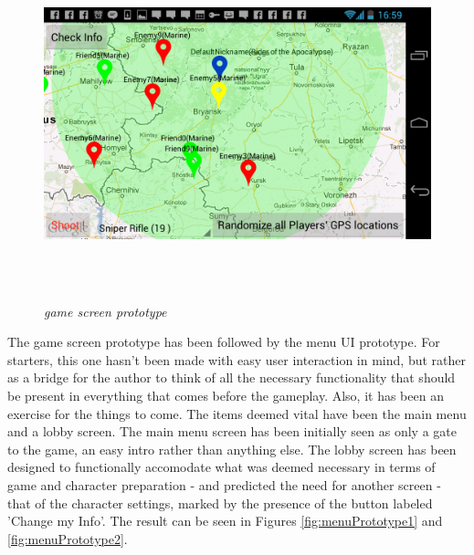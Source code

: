\documentclass{article}
\begin{document}
\begin{figure}
\includegraphics[height=4in,width=7.12in]{./images/android_screenshots/ui_prototype/UI_prototype_5.png}  
\caption{\small \sl game screen prototype \label{fig:UIPrototype5}}
\end{figure}


The game screen prototype has been followed by the menu UI prototype. For
starters, this one hasn't been made with easy user interaction in mind, but
rather as a bridge for the author to think of all the necessary functionality
that should be present in everything that comes before the gameplay. Also, it
has been an exercise for the things to come. The items deemed vital have been
the main menu and a lobby screen. The main menu screen has been initially seen
as only a gate to the game, an easy intro rather than anything else. The lobby
screen has been designed to functionally accomodate what was deemed necessary in
terms of game and character preparation - and predicted the need for another
screen - that of the character settings, marked by the presence of the button
labeled 'Change my Info'. The result can be seen in Figures
\ref{fig:menuPrototype1} and \ref{fig:menuPrototype2}.
\end{document}
